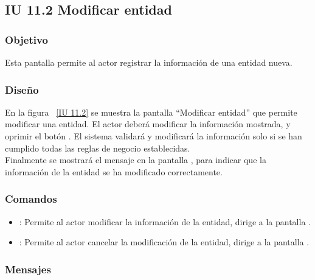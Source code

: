 \newpage 
\subsection{IU 11.2 Modificar entidad}

\subsubsection{Objetivo}
	
	Esta pantalla permite al actor registrar la información de una entidad nueva.

\subsubsection{Diseño}

    En la figura ~\ref{IU 11.2} se muestra la pantalla ``Modificar entidad'' que permite modificar una entidad. El actor deberá modificar la información mostrada,
    y oprimir el botón . El sistema validará y modificará la información solo si se han cumplido todas las reglas de negocio establecidas. \\
    
    Finalmente se mostrará el mensaje  en la pantalla , para indicar que la información de la entidad se ha modificado correctamente.        

	

\subsubsection{Comandos}
\begin{itemize}
	\item {}: Permite al actor modificar la información de la entidad, dirige a la pantalla .
	\item {}: Permite al actor cancelar la modificación de la entidad, dirige a la pantalla .
\end{itemize}

\subsubsection{Mensajes}

